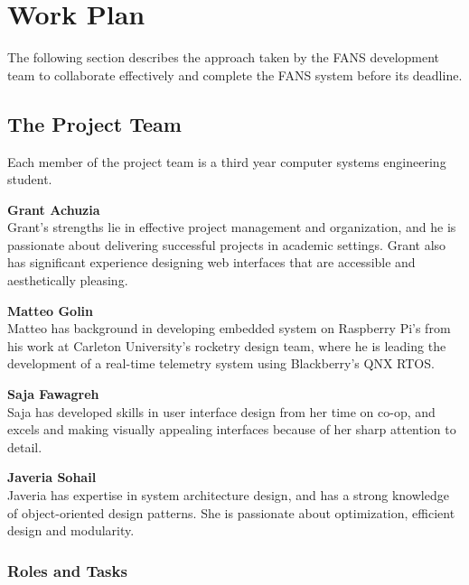 \section{Work Plan}

The following section describes the approach taken by the FANS development team to collaborate effectively and complete
the FANS system before its deadline.

\subsection{The Project Team}

Each member of the project team is a third year computer systems engineering student.

\textbf{Grant Achuzia} \\
Grant's strengths lie in effective project management and organization, and he is passionate about delivering successful
projects in academic settings. Grant also has significant experience designing web interfaces that are accessible and
aesthetically pleasing.

\textbf{Matteo Golin} \\
Matteo has background in developing embedded system on Raspberry Pi's from his work at Carleton University's rocketry
design team, where he is leading the development of a real-time telemetry system using Blackberry's QNX RTOS.

\textbf{Saja Fawagreh} \\
Saja has developed skills in user interface design from her time on co-op, and excels and making visually appealing
interfaces because of her sharp attention to detail.

\textbf{Javeria Sohail} \\
Javeria has expertise in system architecture design, and has a strong knowledge of object-oriented design patterns. She
is passionate about optimization, efficient design and modularity.

\subsubsection{Roles and Tasks}

